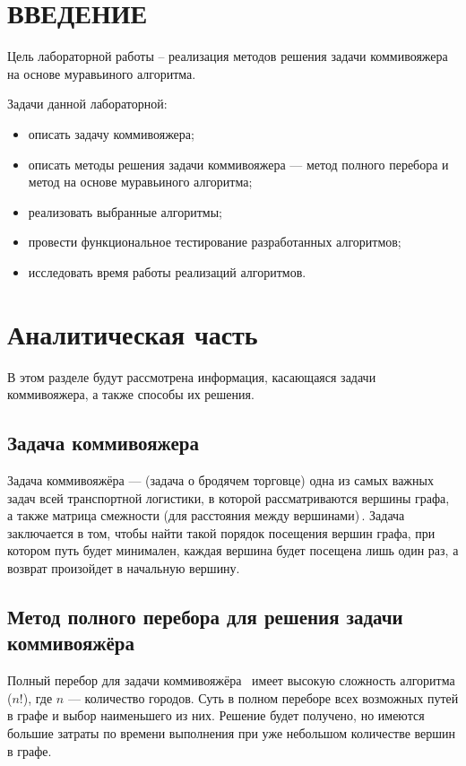 \chapter*{ВВЕДЕНИЕ}

Цель лабораторной работы -- реализация методов решения задачи коммивояжера на основе муравьиного алгоритма.

Задачи данной лабораторной:
\begin{itemize}
	\item описать задачу коммивояжера;
	\item описать методы решения задачи коммивояжера --- метод полного перебора и метод на основе муравьиного алгоритма;
	\item реализовать выбранные алгоритмы;
	\item провести функциональное тестирование разработанных алгоритмов;
	\item исследовать время работы реализаций алгоритмов.  
\end{itemize}

\chapter{Аналитическая часть}
В этом разделе будут рассмотрена информация, касающаяся задачи коммивояжера, а также способы их решения.


\section{Задача коммивояжера}

Задача коммивояжёра  --- (задача о бродячем торговце) одна из самых важных задач всей транспортной логистики, в которой рассматриваются вершины графа, а также матрица смежности (для расстояния между вершинами)\,\cite{task}. 
Задача заключается в том, чтобы найти такой порядок посещения вершин графа, при котором путь будет минимален, каждая вершина будет посещена лишь один раз, а возврат произойдет в начальную вершину. 



\section{Метод полного перебора для решения задачи коммивояжёра}

Полный перебор для задачи коммивояжёра~\cite{fullcomb} имеет высокую сложность алгоритма ($n!$), где $n$ --- количество городов. 
Суть в полном переборе всех возможных путей в графе и выбор наименьшего из них. 
Решение будет получено, но имеются большие затраты по времени выполнения при уже небольшом количестве вершин в графе.

